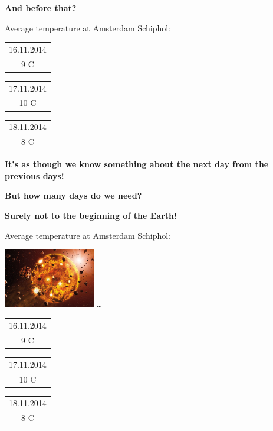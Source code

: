 \documentclass{beamer}
\newcommand{\placard}[1]{
  \begin{frame}
    \begin{center}
      \huge
      \textbf{#1}
    \end{center}
  \end{frame}
}
\newcommand{\pagestepalt}[2]{
  \begin{frame}[t]
    \begin{minipage}[t][0.26\textheight][t]{\textwidth}
      \begin{center}
        \huge
        \textbf{#1}
      \end{center}
    \end{minipage}
    
    \begin{minipage}[t][0.7\textheight][c]{\textwidth}
      #2
    \end{minipage}
  \end{frame}
}
\begin{document}
\pagestepalt{And before that?}{
  Average temperature at Amsterdam Schiphol:\\
  \begin{flushright}
    \begin{tabular}{|c|}
      \hline
      16.11.2014 \\
      {\Huge 9 C} \\
      \hline
    \end{tabular}
    \begin{tabular}{|c|}
      \hline
      17.11.2014 \\
      {\Huge 10 C} \\
      \hline
    \end{tabular}
    \begin{tabular}{|c|}
      \hline
      18.11.2014 \\
      {\Huge 8 C} \\
      \hline
    \end{tabular}
  \end{flushright}
}


\placard{It's as though we know something about the next day from the
  previous days!}

\placard{But how many days do we need?}

\pagestepalt{Surely not to the beginning of the Earth!}{
  Average temperature at Amsterdam Schiphol:\\
  \begin{flushright}
    \includegraphics[width=0.3\textwidth]{../images/formation.jpg}
    {\Huge\ldots}
    \begin{tabular}{|c|}
      \hline
      16.11.2014 \\
      {\Huge 9 C} \\
      \hline
    \end{tabular}
    \begin{tabular}{|c|}
      \hline
      17.11.2014 \\
      {\Huge 10 C} \\
      \hline
    \end{tabular}
    \begin{tabular}{|c|}
      \hline
      18.11.2014 \\
      {\Huge 8 C} \\
      \hline
    \end{tabular}
  \end{flushright}
}
\end{document}
